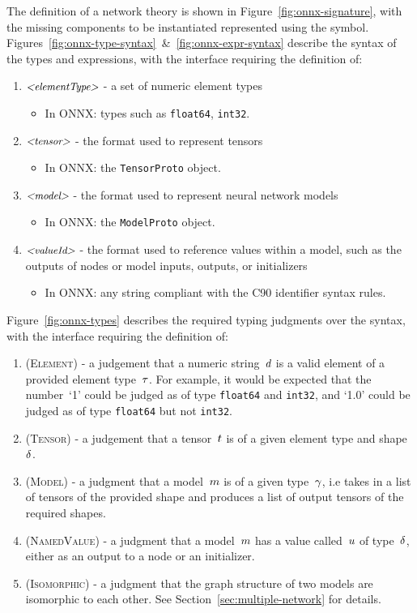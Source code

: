 The definition of a network theory is shown in Figure~\ref{fig:onnx-signature}, with the missing components to be instantiated represented using the \missing{} symbol.
Figures~\ref{fig:onnx-type-syntax}~\&~\ref{fig:onnx-expr-syntax} describe the syntax of the types and expressions, with the interface requiring the definition of:
\begin{enumerate}
\item $\text{\small \textit{<elementType>}}$ - a set of numeric element types
\begin{itemize}
\item In ONNX: types such as \texttt{float64}, \texttt{int32}.
\end{itemize}
\item $\text{\small \textit{<tensor>}}$ - the format used to represent tensors 
\begin{itemize}
\item In ONNX: the \texttt{TensorProto} object.
\end{itemize}
\item $\text{\small \textit{<model>}}$ - the format used to represent neural network models
\begin{itemize}
\item In ONNX: the \texttt{ModelProto} object.
\end{itemize}
\item $\text{\small \textit{<valueId>}}$ - the format used to reference values within a model, such as the outputs of nodes or model inputs, outputs, or initializers
\begin{itemize}
	\item In ONNX: any string compliant with the C90 identifier syntax rules.
\end{itemize}
\end{enumerate}
Figure~\ref{fig:onnx-types} describes the required typing judgments over the syntax, with the interface requiring the definition of:
\begin{enumerate}
\item \textsc{(Element)} - a judgement that a numeric string~$d$ is a valid element of a provided element type~$\tau$. For example, it would be expected that the number~`1' could be judged as of type \texttt{float64} and \texttt{int32}, and `1.0' could be judged as of type \texttt{float64} but not \texttt{int32}.
\item \textsc{(Tensor)} - a judgement that a tensor~$t$ is of a given element type and shape~$\delta$.
\item \textsc{(Model)} - a judgment that a model~$m$ is of a given type~$\gamma$, i.e takes in a list of tensors of the provided shape and produces a list of output tensors of the required shapes.
\item \textsc{(NamedValue)} - a judgment that a model~$m$ has a value called~$u$ of type~$\delta$, either as an output to a node or an initializer.
\item \textsc{(Isomorphic)} - a judgment that the graph structure of two models are isomorphic to each other. See Section~\ref{sec:multiple-network} for details.
\end{enumerate}

